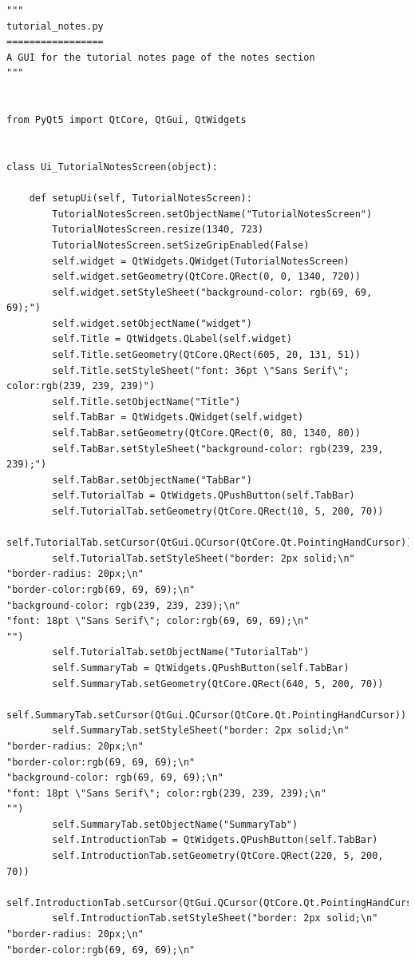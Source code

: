 \documentclass{article}
\begin{document}
\begin{lstlisting}
"""
tutorial_notes.py
=================
A GUI for the tutorial notes page of the notes section
"""


from PyQt5 import QtCore, QtGui, QtWidgets


class Ui_TutorialNotesScreen(object):

    def setupUi(self, TutorialNotesScreen):
        TutorialNotesScreen.setObjectName("TutorialNotesScreen")
        TutorialNotesScreen.resize(1340, 723)
        TutorialNotesScreen.setSizeGripEnabled(False)
        self.widget = QtWidgets.QWidget(TutorialNotesScreen)
        self.widget.setGeometry(QtCore.QRect(0, 0, 1340, 720))
        self.widget.setStyleSheet("background-color: rgb(69, 69, 69);")
        self.widget.setObjectName("widget")
        self.Title = QtWidgets.QLabel(self.widget)
        self.Title.setGeometry(QtCore.QRect(605, 20, 131, 51))
        self.Title.setStyleSheet("font: 36pt \"Sans Serif\"; color:rgb(239, 239, 239)")
        self.Title.setObjectName("Title")
        self.TabBar = QtWidgets.QWidget(self.widget)
        self.TabBar.setGeometry(QtCore.QRect(0, 80, 1340, 80))
        self.TabBar.setStyleSheet("background-color: rgb(239, 239, 239);")
        self.TabBar.setObjectName("TabBar")
        self.TutorialTab = QtWidgets.QPushButton(self.TabBar)
        self.TutorialTab.setGeometry(QtCore.QRect(10, 5, 200, 70))
        self.TutorialTab.setCursor(QtGui.QCursor(QtCore.Qt.PointingHandCursor))
        self.TutorialTab.setStyleSheet("border: 2px solid;\n"
"border-radius: 20px;\n"
"border-color:rgb(69, 69, 69);\n"
"background-color: rgb(239, 239, 239);\n"
"font: 18pt \"Sans Serif\"; color:rgb(69, 69, 69);\n"
"")
        self.TutorialTab.setObjectName("TutorialTab")
        self.SummaryTab = QtWidgets.QPushButton(self.TabBar)
        self.SummaryTab.setGeometry(QtCore.QRect(640, 5, 200, 70))
        self.SummaryTab.setCursor(QtGui.QCursor(QtCore.Qt.PointingHandCursor))
        self.SummaryTab.setStyleSheet("border: 2px solid;\n"
"border-radius: 20px;\n"
"border-color:rgb(69, 69, 69);\n"
"background-color: rgb(69, 69, 69);\n"
"font: 18pt \"Sans Serif\"; color:rgb(239, 239, 239);\n"
"")
        self.SummaryTab.setObjectName("SummaryTab")
        self.IntroductionTab = QtWidgets.QPushButton(self.TabBar)
        self.IntroductionTab.setGeometry(QtCore.QRect(220, 5, 200, 70))
        self.IntroductionTab.setCursor(QtGui.QCursor(QtCore.Qt.PointingHandCursor))
        self.IntroductionTab.setStyleSheet("border: 2px solid;\n"
"border-radius: 20px;\n"
"border-color:rgb(69, 69, 69);\n"

\end{lstlisting}
\end{document}
